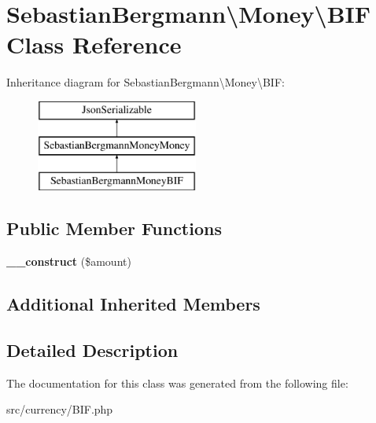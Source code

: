 \hypertarget{classSebastianBergmann_1_1Money_1_1BIF}{}\section{Sebastian\+Bergmann\textbackslash{}Money\textbackslash{}B\+I\+F Class Reference}
\label{classSebastianBergmann_1_1Money_1_1BIF}
Inheritance diagram for Sebastian\+Bergmann\textbackslash{}Money\textbackslash{}B\+I\+F\+:\begin{figure}[H]
\begin{center}
\leavevmode
\includegraphics[height=3.000000cm]{classSebastianBergmann_1_1Money_1_1BIF}
\end{center}
\end{figure}
\subsection*{Public Member Functions}
\begin{DoxyCompactItemize}
\item 
\hypertarget{classSebastianBergmann_1_1Money_1_1BIF_ac7037ebae62835a236239577d7460f9a}{}{\bfseries \+\_\+\+\_\+construct} (\$amount)\label{classSebastianBergmann_1_1Money_1_1BIF_ac7037ebae62835a236239577d7460f9a}

\end{DoxyCompactItemize}
\subsection*{Additional Inherited Members}


\subsection{Detailed Description}


The documentation for this class was generated from the following file\+:\begin{DoxyCompactItemize}
\item 
src/currency/B\+I\+F.\+php\end{DoxyCompactItemize}
